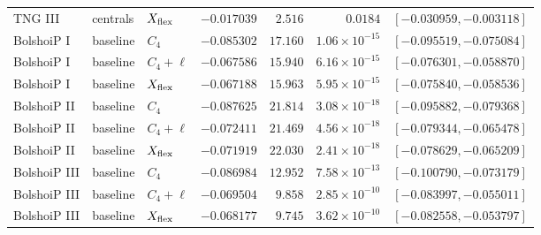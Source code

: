 \begin{tabular}{lllrrrl}
TNG III & centrals & $X_{\rm flex}$ & $-0.017039$ & $2.516$ & $0.0184$ & $[-0.030959, -0.003118]$ \\
BolshoiP I & baseline & $C_4$ & $-0.085302$ & $17.160$ & $1.06\times10^{-15}$ & $[-0.095519, -0.075084]$ \\
BolshoiP I & baseline & $C_4+\ell$ & $-0.067586$ & $15.940$ & $6.16\times10^{-15}$ & $[-0.076301, -0.058870]$ \\
BolshoiP I & baseline & $X_{\rm flex}$ & $-0.067188$ & $15.963$ & $5.95\times10^{-15}$ & $[-0.075840, -0.058536]$ \\
BolshoiP II & baseline & $C_4$ & $-0.087625$ & $21.814$ & $3.08\times10^{-18}$ & $[-0.095882, -0.079368]$ \\
BolshoiP II & baseline & $C_4+\ell$ & $-0.072411$ & $21.469$ & $4.56\times10^{-18}$ & $[-0.079344, -0.065478]$ \\
BolshoiP II & baseline & $X_{\rm flex}$ & $-0.071919$ & $22.030$ & $2.41\times10^{-18}$ & $[-0.078629, -0.065209]$ \\
BolshoiP III & baseline & $C_4$ & $-0.086984$ & $12.952$ & $7.58\times10^{-13}$ & $[-0.100790, -0.073179]$ \\
BolshoiP III & baseline & $C_4+\ell$ & $-0.069504$ & $9.858$ & $2.85\times10^{-10}$ & $[-0.083997, -0.055011]$ \\
BolshoiP III & baseline & $X_{\rm flex}$ & $-0.068177$ & $9.745$ & $3.62\times10^{-10}$ & $[-0.082558, -0.053797]$ \\
\bottomrule
\end{tabular}
